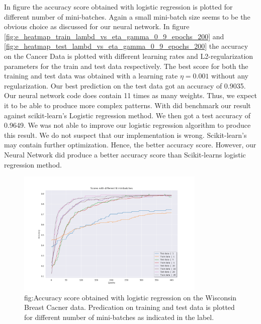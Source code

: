 In figure the accuracy score obtained with logistic regression is plotted for
different number of mini-batches. Again a small mini-batch size seems to be the
obvious choice as discussed for our neural network. In figure
\ref{fig:e_heatmap_train_lambd_vs_eta_gamma_0_9_epochs_200} and
\ref{fig:e_heatmap_test_lambd_vs_eta_gamma_0_9_epochs_200} the accuracy on the
Cancer Data is plotted with different learning rates and L2-regularization
parameters for the train and test data respectively. The best score for both
the training and test data was obtained with a learning rate $\eta = 0.001$
without any regularization. Our best prediction on the test data got an
accuracy of 0.9035. Our neural network code does contain 11 times as many
weights. Thus, we expect it to be able to produce more complex patterns. 
With did benchmark our result against scikit-learn's Logistic regression
method. We then got a test accuracy of  0.9649. We was not able to improve our
logistic regression algorithm to produce this result. We do not suspect that
our implementation is wrong. Scikit-learn's may contain further optimization.
Hence, the better accuracy score. However, our Neural Network did produce a
better accuracy score than Scikit-learns logistic regression method.

\begin{figure}[H]
    \centering
    \includegraphics[width=0.8\textwidth]{Figures/PartE/e_line_n_minibatches_gamma_0_9.png}
    \caption{fig:Accuracy score obtained with logistic regression on the
        Wisconsin Breast Cacner data. Predication on training and test data is
    plotted for different number of mini-batches as indicated in the label.}  
    \label{fig:e_line_n_minibatches_gamma_0_9} 

\end{figure}

